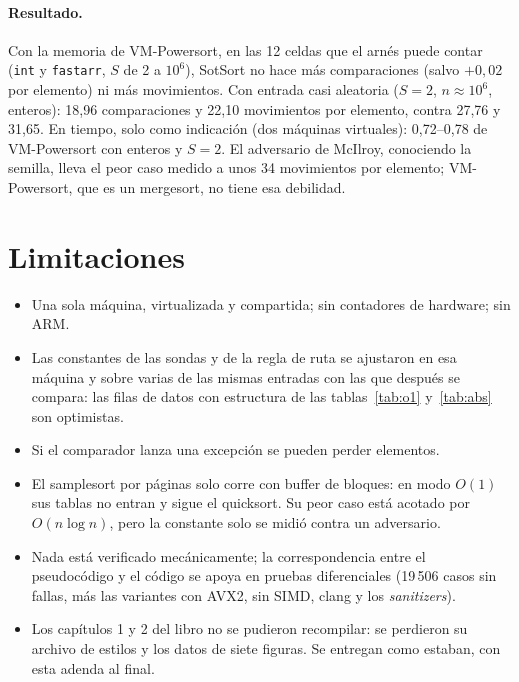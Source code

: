 \documentclass[10pt,a4paper]{article}
\begin{document}
\paragraph{Resultado.} Con la memoria de VM-Powersort, en las 12 celdas que el arnés puede contar
(\texttt{int} y \texttt{fastarr}, $S$ de 2 a $10^6$), SotSort no hace más comparaciones (salvo
$+0{,}02$ por elemento) ni más movimientos. Con entrada casi aleatoria ($S=2$, $n\approx10^6$,
enteros): 18{,}96 comparaciones y 22{,}10 movimientos por elemento, contra 27{,}76 y 31{,}65.
En tiempo, solo como indicación (dos máquinas virtuales): 0{,}72--0{,}78 de VM-Powersort con
enteros y $S=2$. El adversario de McIlroy, conociendo la semilla, lleva el peor caso medido a unos
34 movimientos por elemento; VM-Powersort, que es un mergesort, no tiene esa debilidad.

\section{Limitaciones}
\begin{itemize}[nosep]
\item Una sola máquina, virtualizada y compartida; sin contadores de hardware; sin ARM.
\item Las constantes de las sondas y de la regla de ruta se ajustaron en esa máquina y
  sobre varias de las mismas entradas con las que después se compara: las filas de datos
  con estructura de las tablas~\ref{tab:o1} y~\ref{tab:abs} son optimistas.
\item Si el comparador lanza una excepción se pueden perder elementos.
\item El samplesort por páginas solo corre con buffer de bloques: en modo $O(1)$ sus tablas no
  entran y sigue el quicksort. Su peor caso está acotado por $O(n\log n)$, pero la constante solo
  se midió contra un adversario.
\item Nada está verificado mecánicamente; la correspondencia entre el pseudocódigo y el
  código se apoya en pruebas diferenciales (19\,506 casos sin fallas, más las variantes
  con AVX2, sin SIMD, clang y los \emph{sanitizers}).
\item Los capítulos 1 y 2 del libro no se pudieron recompilar: se perdieron su archivo
  de estilos y los datos de siete figuras. Se entregan como estaban, con esta adenda al
  final.
\end{itemize}
\end{document}
